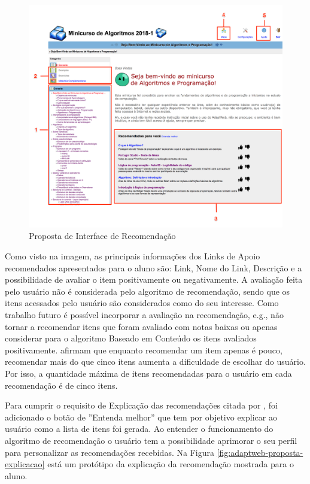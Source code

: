 \begin{figure}[htb]
  \caption{\label{fig:adaptweb-proposta-recomendacao}Proposta de Interface de Recomendação}
  \begin{center}
      \includegraphics[scale=0.4]{./Figuras/interface-recomendacao.png}
  \end{center}
\end{figure}

Como visto na imagem, as principais informações dos Links de Apoio recomendados apresentados para o aluno são: Link, Nome do Link, Descrição e a possibilidade de avaliar o item
positivamente ou negativamente. A avaliação feita pelo usuário não é considerada pelo algoritmo de recomendação, sendo que os itens acessados pelo
usuário são considerados como do seu interesse. Como trabalho futuro é possível incorporar a avaliação na recomendação, e.g.,
não tornar a recomendar itens que foram avaliado com notas baixas ou apenas considerar para o algoritmo Baseado em Conteúdo
os itens avaliados positivamente.  afirmam que enquanto recomendar um item apenas é pouco, recomendar mais do que cinco itens
aumenta a dificuldade de escolhar do usuário. Por isso, a quantidade máxima de itens recomendadas para o usuário em cada
recomendação é de cinco itens.

Para cumprir o requisito de Explicação das recomendações citada por , foi adicionado o
botão de ''Entenda melhor'' que tem por objetivo explicar ao usuário como a lista de itens foi gerada. Ao entender o
funcionamento do algoritmo de recomendação o usuário tem a possibilidade aprimorar o seu perfil para personalizar as
recomendações recebidas. Na Figura \ref{fig:adaptweb-proposta-explicacao} está um protótipo da explicação da recomendação
mostrada para o aluno.

